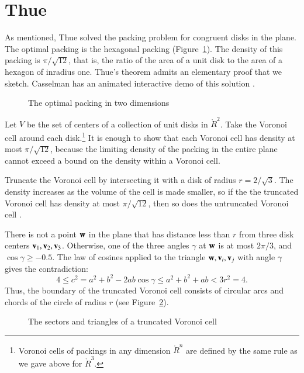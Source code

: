 \section{Thue}\label{sec:thue}


As mentioned, Thue solved the packing problem for congruent disks in
the plane.  The optimal packing is the hexagonal packing
(Figure~\ref{fig:2D-hex}).  The density of this packing is
$\pi/\sqrt{12}$, that is, the ratio of the area of a unit disk to the area of a
hexagon of inradius one.  Thue's theorem admits an elementary proof that
we sketch.    Casselman has an animated interactive demo of this
solution \cite{casselman:pennies}.

\begin{figure}[htb]
  \centering
  \caption{The optimal packing in two dimensions}
  \label{fig:2D-hex}
\end{figure}

Let $V$ be the set of centers of a collection of unit disks in
$\ring{R}^2$.  Take the Voronoi cell around each
disk.\footnote{Voronoi cells of packings in any dimension $\ring{R}^n$
  are defined by the same rule as we gave above for $\ring{R}^3$.}   It
is enough to show that each Voronoi cell has density at most
$\pi/\sqrt{12}$, because the limiting density of the packing in the entire plane cannot exceed
a bound on the density within a Voronoi cell.  


Truncate the Voronoi cell by intersecting it with a disk of radius
$r=2/\sqrt3$.   The density increases as the volume of the cell is made smaller,
so if the the truncated Voronoi cell
has density at most $\pi/\sqrt{12}$, then so does the untruncated Voronoi cell .

There is not a point ${\mathbf w}$ in the plane that has distance less than $r$
from three disk centers ${\mathbf v}_1,{\mathbf v}_2,{\mathbf v}_3$.  Otherwise, one of the three
angles $\gamma$ at ${\mathbf w}$ is at most $2\pi/3$, and $\cos\gamma\ge -0.5$.
The law of cosines applied to the triangle ${\mathbf w},{\mathbf v}_i,{\mathbf v}_j$ with angle
$\gamma$ gives the contradiction:
   \begin{displaymath}
   4 \le c^2 = a^2 + b^2 - 2 a b \cos\gamma 
   \le a^2 + b^2 + a b < 3r^2 = 4.
   \end{displaymath}
Thus, the boundary of the truncated Voronoi cell consists of circular
arcs and chords of the circle of radius $r$ (see Figure~\ref{fig:2D-proof}).

\begin{figure}[htb]
  \centering
  \caption{The sectors and triangles of a truncated Voronoi cell}
  \label{fig:2D-proof}
\end{figure}

